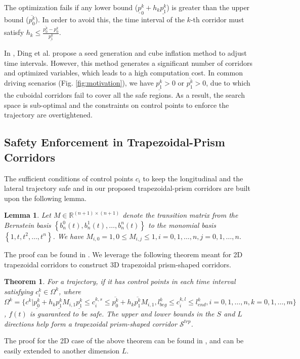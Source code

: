 \documentclass[journal,a4paper,onecolumn,12pt]{IEEEtran}
\newtheorem{lemma}{Lemma}
\newtheorem{theorem}{Theorem}
\begin{document}
The optimization fails if any lower bound ($\underline{p}_{0}^{k}+h_{k} \underline{p_{1}^{k}}$) is greater than the upper bound ($\overline{p_{0}^{k}}$). In order to avoid this, the time interval of the $k$-th corridor must satisfy $h_{k} \leq \frac{\overline{p_{0}^{k}}-p_{0}^{k}}{\underline{p_{1}^{k}}}$.

In \cite{ding_safe_2019}, Ding et al. propose a seed generation and cube inflation method to adjust time intervals. However, this method generates a significant number of corridors and optimized variables, which leads to a high computation cost.
In common driving scenarios (Fig. \ref{fig:motivation}), we have $\underline{p_{1}^{k}} > 0$ or $\overline{p_{1}^{k}} > 0$, due to which the cuboidal corridors fail to cover all the safe regions. As a result, the search space is sub-optimal and the constraints on control points to enforce the trajectory are overtightened.

\subsection{Safety Enforcement in Trapezoidal-Prism Corridors}
The sufficient conditions of control points $c_i$ to keep the longitudinal and the lateral trajectory safe and in our proposed trapezoidal-prism corridors are built upon the following lemma.

\begin{lemma}
Let $M \in \mathbb{R}^{(n+1) \times(n+1)}$ denote the transition matrix from the Bernstein basis $\left\{b_{n}^{0}(t), b_{n}^{1}(t), \ldots, b_{n}^{n}(t)\right\}$ to the monomial basis $\left\{1, t, t^{2}, \ldots, t^{n}\right\}$. We have $M_{i, 0}=1,0 \leq M_{i, j} \leq 1, i=0,1, \ldots, n, j=0,1, \ldots, n$.
\end{lemma}
The proof can be found in \cite{li_motion_nodate}. We leverage the following theorem meant for 2D trapezoidal corridors to construct 3D trapezoidal prism-shaped corridors.
\begin{theorem}
For a trajectory, if it has control points in each time interval satisfying $c_{i}^k \in \Omega^k$, where $\Omega^k = \{c^k | \underline{p_{0}^{k}}+h_{k}\underline{p_{1}^{k}}M_{i,1} \underline{p_{1}^{k}} \leq c_{i}^{k,s} \leq \overline{p_{0}^{k}}+h_{k}\overline{p_{1}^{k}}M_{i,1}, l^{k}_{beg} \leq c_{i}^{k,l} \leq l^{k}_{end}, i=0,1,\ldots,n,k=0,1,\ldots,m\}$, $f(t)$ is guaranteed to be safe. The upper and lower bounds in the $S$ and $L$ directions help form a trapezoidal prism-shaped corridor $\mathcal{S}^{trp}$.
\end{theorem}
The proof for the 2D case of the above theorem can be found in \cite{li_motion_nodate}, and can be easily extended to another dimension $L$.
\end{document}
